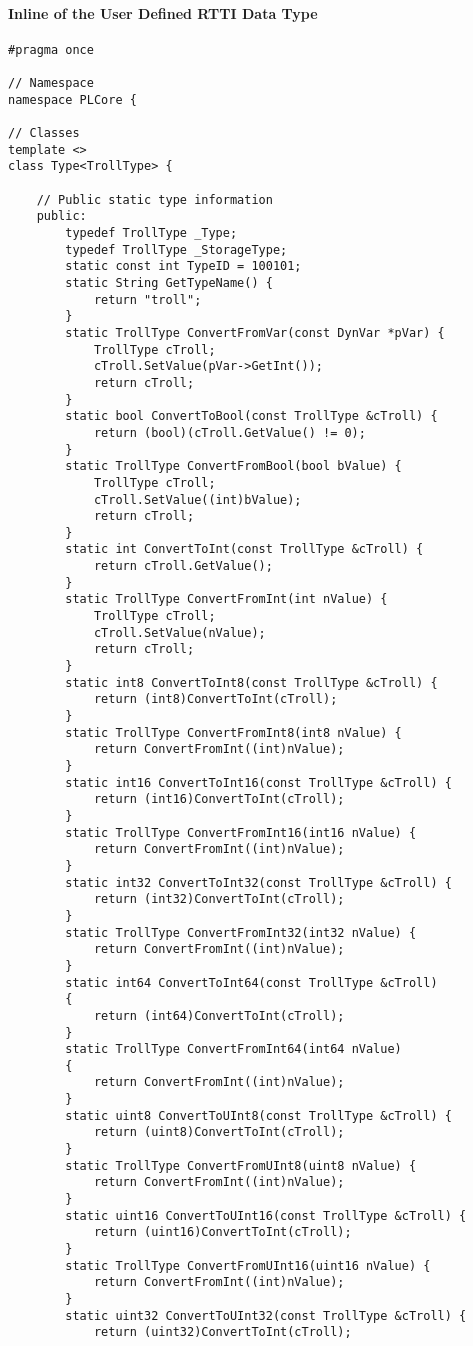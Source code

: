 \paragraph{Inline of the User Defined RTTI Data Type}
\begin{lstlisting}[label=Code:UserDefinedRTTIDataTypeInline,caption={Inline of the user defined RTTI data type}]
#pragma once

// Namespace
namespace PLCore {

// Classes
template <>
class Type<TrollType> {

	// Public static type information
	public:
		typedef TrollType _Type;
		typedef TrollType _StorageType;
		static const int TypeID = 100101;
		static String GetTypeName() {
			return "troll";
		}
		static TrollType ConvertFromVar(const DynVar *pVar) {
			TrollType cTroll;
			cTroll.SetValue(pVar->GetInt());
			return cTroll;
		}
		static bool ConvertToBool(const TrollType &cTroll) {
			return (bool)(cTroll.GetValue() != 0);
		}
		static TrollType ConvertFromBool(bool bValue) {
			TrollType cTroll;
			cTroll.SetValue((int)bValue);
			return cTroll;
		}
		static int ConvertToInt(const TrollType &cTroll) {
			return cTroll.GetValue();
		}
		static TrollType ConvertFromInt(int nValue) {
			TrollType cTroll;
			cTroll.SetValue(nValue);
			return cTroll;
		}
		static int8 ConvertToInt8(const TrollType &cTroll) {
			return (int8)ConvertToInt(cTroll);
		}
		static TrollType ConvertFromInt8(int8 nValue) {
			return ConvertFromInt((int)nValue);
		}
		static int16 ConvertToInt16(const TrollType &cTroll) {
			return (int16)ConvertToInt(cTroll);
		}
		static TrollType ConvertFromInt16(int16 nValue) {
			return ConvertFromInt((int)nValue);
		}
		static int32 ConvertToInt32(const TrollType &cTroll) {
			return (int32)ConvertToInt(cTroll);
		}
		static TrollType ConvertFromInt32(int32 nValue) {
			return ConvertFromInt((int)nValue);
		}
		static int64 ConvertToInt64(const TrollType &cTroll)
		{
			return (int64)ConvertToInt(cTroll);
		}
		static TrollType ConvertFromInt64(int64 nValue)
		{
			return ConvertFromInt((int)nValue);
		}
		static uint8 ConvertToUInt8(const TrollType &cTroll) {
			return (uint8)ConvertToInt(cTroll);
		}
		static TrollType ConvertFromUInt8(uint8 nValue) {
			return ConvertFromInt((int)nValue);
		}
		static uint16 ConvertToUInt16(const TrollType &cTroll) {
			return (uint16)ConvertToInt(cTroll);
		}
		static TrollType ConvertFromUInt16(uint16 nValue) {
			return ConvertFromInt((int)nValue);
		}
		static uint32 ConvertToUInt32(const TrollType &cTroll) {
			return (uint32)ConvertToInt(cTroll);

\end{lstlisting}
